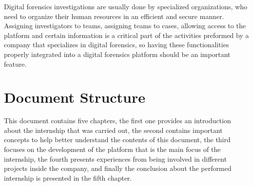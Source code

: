 Digital forensics investigations are usually done by specialized organizations, who need to organize their human resources in an efficient and secure manner.
Assigning investigators to teams, assigning teams to cases, allowing access to the platform and certain information is a critical part of the activities preformed by
a company that specializes in digital forensics, so having these functionalities properly integrated into a digital forensics platform should be an important feature.


\section{Document Structure}

This document contains five chapters, the first one provides an introduction about the internship that was carried out, 
the second contains important concepts to help better understand the contents of this document, the third focuses on the development
of the platform that is the main focus of the internship, the fourth presents experiences from being involved in different projects inside the company,
and finally the conclusion about the performed internship is presented in the fifth chapter.
